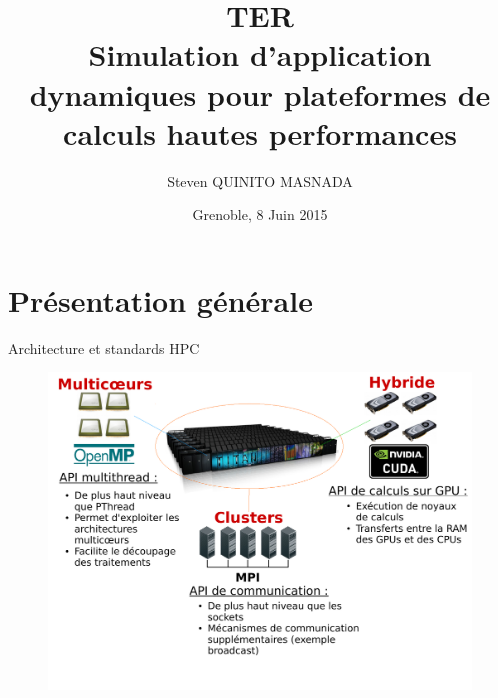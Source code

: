 \documentclass[11pt,xcolor=dvipsnames,presentation]{beamer}
\institute{Équipe MESCAL/LIG\\Sous la direction d'A. Legrand}
\author{Steven QUINITO MASNADA}
\date{Grenoble, 8 Juin 2015}
\title{\textbf{TER} \\ Simulation d'application dynamiques pour plateformes de calculs hautes performances}
\begin{document}
\maketitle

\section{Présentation générale}
\label{sec-1}
\begin{frame}[label=sec-1-1]{Architecture et standards HPC}
\begin{figure}[tbh]
\centering
\vspace{-1.5mm}
\includegraphics[width=\linewidth]{./Slides/Archi.pdf}
\end{figure}
\end{frame}
\end{document}
